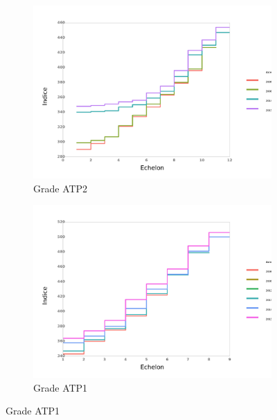 \documentclass[11pt,a4paper]{article}
\begin{document}
\begin{figure}[ht]
\begin{subfigure}[b]{0.55\linewidth}
  \end{subfigure} 
  \begin{subfigure}[b]{0.55\linewidth}
        \caption{Grade ATP2} 
    \label{echelon_by_neg_2} 
    \centering
    \includegraphics[width=1\linewidth]{2_grille_by_neg.pdf} 
  \end{subfigure}%
  \begin{subfigure}[b]{0.55\linewidth}
        \caption{Grade ATP1} 
    \label{echelon_by_neg_3} 
    \centering
    \includegraphics[width=1\linewidth]{3_grille_by_neg.pdf} 
  \end{subfigure} 
\end{figure}
\end{document}

